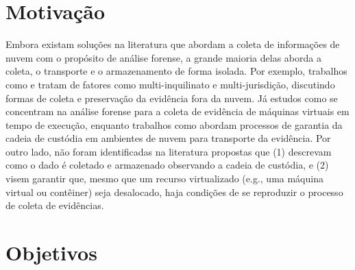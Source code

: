 \section{Motivação}
\label{sec:intro-motiv}


%
Embora existam soluções na literatura que abordam a coleta de informações de nuvem com o propósito de análise forense, a grande maioria delas aborda a coleta, o transporte e o armazenamento de forma isolada.
%
Por exemplo, trabalhos como \cite{DykstraFROST:2013} e \cite{ReichertAutoAcquisition:2015} tratam de fatores como multi-inquilinato e multi-jurisdição, discutindo formas de coleta e preservação da evidência fora da nuvem.
%
Já estudos como \cite{GeorgeDF2CE:2012} se concentram na análise forense para a coleta de evidência de máquinas virtuais em tempo de execução, enquanto trabalhos como \cite{SangLogApproach:2013} abordam processos de garantia da cadeia de custódia em ambientes de nuvem para transporte da evidência.
%
%
%
Por outro lado, não foram identificadas na literatura propostas que (1) descrevam como o dado é coletado e armazenado observando a cadeia de custódia, e (2) visem garantir que, mesmo que um recurso virtualizado (e.g., uma máquina virtual ou contêiner) seja desalocado, haja condições de se reproduzir o processo de coleta de evidências.

\section{Objetivos}
\label{sec:intro-objetivos}

